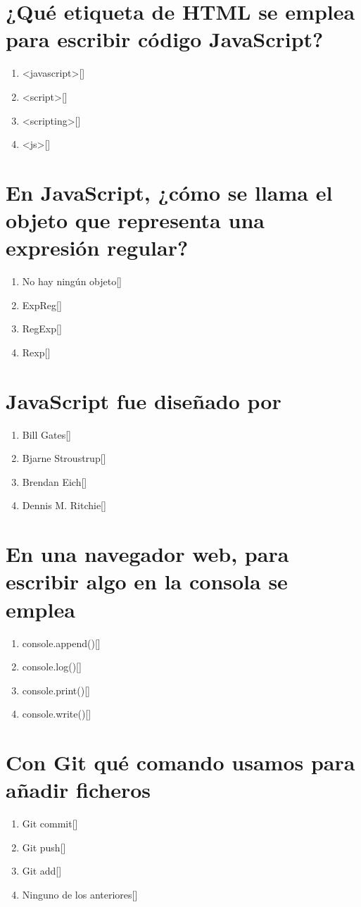 \documentclass[addpoints, 12]{exam}{article}
\begin{document}
\section{¿Qué etiqueta de HTML se emplea para escribir código JavaScript?}
\label{sec:org4491e09}
\begin{enumerate}
\item <javascript>[]
\item <script>[]
\item <scripting>[]
\item <js>[]
\end{enumerate}

\section{En JavaScript, ¿cómo se llama el objeto que representa una expresión regular?}
\label{sec:org3d5e66a}
\begin{enumerate}
\item No hay ningún objeto[]
\item ExpReg[]
\item RegExp[]
\item Rexp[]
\end{enumerate}

\section{JavaScript fue diseñado por}
\label{sec:org619c6b3}
\begin{enumerate}
\item Bill Gates[]
\item Bjarne Stroustrup[]
\item Brendan Eich[]
\item Dennis M. Ritchie[]
\end{enumerate}

\section{En una navegador web, para escribir algo en la consola se emplea}
\label{sec:orgf4c893b}
\begin{enumerate}
\item console.append()[]
\item console.log()[]
\item console.print()[]
\item console.write()[]
\end{enumerate}

\section{Con Git qué comando usamos para añadir ficheros}
\label{sec:org36cf817}
\begin{enumerate}
\item Git commit[]
\item Git push[]
\item Git add[]
\item Ninguno de los anteriores[]
\end{enumerate}
\end{document}
